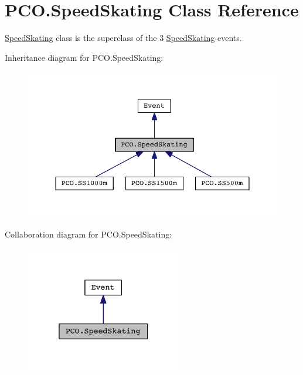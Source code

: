 \hypertarget{classPCO_1_1SpeedSkating}{\section{P\+C\+O.\+Speed\+Skating Class Reference}
\label{classPCO_1_1SpeedSkating}
}


\hyperlink{classPCO_1_1SpeedSkating}{Speed\+Skating} class is the superclass of the 3 \hyperlink{classPCO_1_1SpeedSkating}{Speed\+Skating} events.  




Inheritance diagram for P\+C\+O.\+Speed\+Skating\+:\nopagebreak
\begin{figure}[H]
\begin{center}
\leavevmode
\includegraphics[width=350pt]{classPCO_1_1SpeedSkating__inherit__graph}
\end{center}
\end{figure}


Collaboration diagram for P\+C\+O.\+Speed\+Skating\+:\nopagebreak
\begin{figure}[H]
\begin{center}
\leavevmode
\includegraphics[width=193pt]{classPCO_1_1SpeedSkating__coll__graph}
\end{center}
\end{figure}
